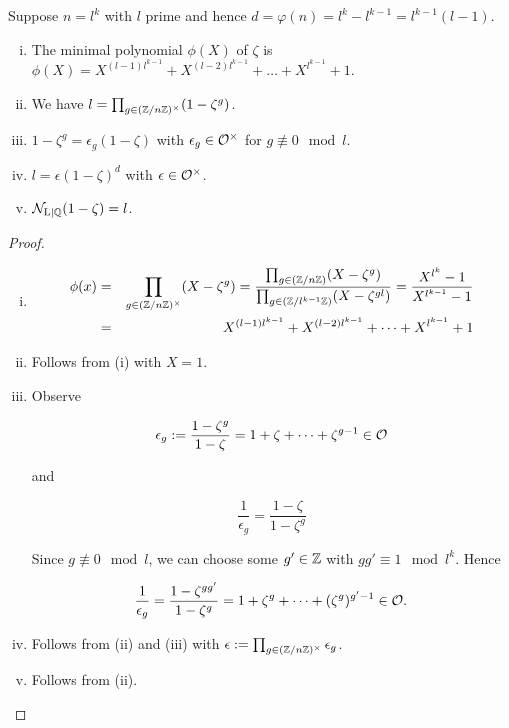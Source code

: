 \begin{Lem}
	Suppose $n = l^k$ with $l$ prime and hence $d = \varphi(n) = l^k - l^{k-1} = l^{k-1}(l-1)$.
	\begin{enumerate}[(i)]
		\item The minimal polynomial $\phi(X)$ of $\zeta$ is $\phi(X) = X^{(l-1)l^{k-1}} + X^{(l-2)l^{k-1}} + \dots + X^{l^{k-1}} + 1$.
		
		\item We have $l = \prod_{g \in (\mathbb{Z}/n\mathbb{Z})^\times} (1-\zeta^g)$.
		
		\item $1-\zeta^g = \epsilon_g(1-\zeta)$ with $\epsilon_g \in \mathcal{O}^\times$ for $g \not\equiv 0 \mod l$.
		
		\item $l = \epsilon(1-\zeta)^d$ with $\epsilon \in \mathcal{O}^\times$.
		
		\item $\operatorname{\mathcal{N}_{L \vert \mathbb{Q}}} (1-\zeta) = l$.
	\end{enumerate}
\end{Lem}
\begin{proof}
	\begin{enumerate}[(i)]
		\item 
		\begin{eqnarray*}
		\phi(x) &=& \prod_{g \in (\mathbb{Z}/n\mathbb{Z})^\times} (X - \zeta^g) = \frac{ \prod_{g \in (\mathbb{Z}/n\mathbb{Z})}(X - \zeta^g)} { \prod_{g \in (\mathbb{Z}/l^{k-1}\mathbb{Z})} (X - \zeta^{gl})} = \frac{X^{l^k} - 1}{X^{l^{k-1}}-1}\\
		&=& X^{(l-1)l^{k-1}} + X^{(l-2)l^{k-1}} + \dots + X^{l^{k-1}} + 1
		\end{eqnarray*}
	
	\item Follows from (i) with $X = 1$.
	
	\item Observe 
	
	\[ \epsilon_g := \frac{1-\zeta^g}{1-\zeta} = 1 + \zeta + \dots +\zeta^{g-1} \in \mathcal{O} \]
	
	and 
	
	\[\frac{1}{\epsilon_g} = \frac{1-\zeta}{1-\zeta^g} \]
	
	Since $g \not\equiv 0 \mod l$, we can choose some $g' \in \mathbb{Z}$ with $gg' \equiv 1 \mod l^k$. Hence
	
	\[\frac{1}{\epsilon_g} = \frac{1-\zeta^{gg'}}{1-\zeta^g} = 1 + \zeta^g + \dots + (\zeta^g)^{g'-1} \in \mathcal{O}.\]
	
	\item Follows from (ii) and (iii) with $\epsilon := \prod_{g \in (\mathbb{Z}/n\mathbb{Z})^\times}\epsilon_g$.
	
	\item Follows from (ii).
	\end{enumerate}
\end{proof}


